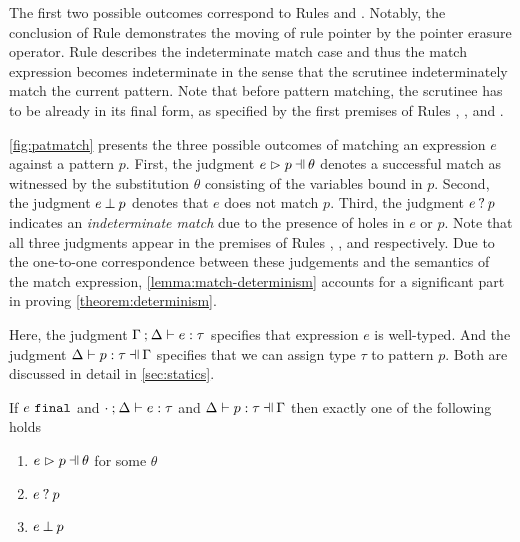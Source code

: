 The first two possible outcomes correspond to Rules \ITSuccMatch and \ITFailMatch. Notably, the conclusion of Rule \ITFailMatch demonstrates the moving of rule pointer by the pointer 
erasure operator. Rule \IMatch describes the indeterminate match case and thus the match expression becomes indeterminate in the sense that the scrutinee indeterminately match the current pattern. 
Note that before pattern matching, the scrutinee has to be already in its final form, as specified by the first premises of Rules \ITSuccMatch, \ITFailMatch, and \IMatch.




\autoref{fig:patmatch} presents the three possible outcomes of matching an expression $e$ against a pattern $p$. 
First, the judgment $\hpatmatch{e}{p}{\theta}$ denotes a successful match as witnessed by the substitution $\theta$ consisting of the variables bound in $p$. Second, the judgment $e \mathbin{\bot} p$ denotes that $e$ does not match $p$. Third, the judgment $e \mathbin{?} p$ indicates an \emph{indeterminate match} due to the presence of holes in $e$ or $p$. Note that all three judgments appear in the premises of Rules \ITSuccMatch, \ITFailMatch, and \IMatch respectively. 
Due to the one-to-one correspondence between these judgements and the semantics of the match expression, \autoref{lemma:match-determinism} accounts for a significant part in proving \autoref{theorem:determinism}.

Here, the judgment $\Gamma \mathbin{;} \Delta \vdash e : \tau$ specifies that expression $e$ is well-typed. And the judgment $\hpattyp{p}{\tau}{\Gamma}{\Delta}$ specifies that we can assign type $\tau$ to pattern $p$. Both are discussed in detail in \autoref{sec:statics}.
\begin{lemma}
  \label{lemma:match-determinism}
  If $e ~\mathtt{final}$ and $\cdot \mathbin{;} \Delta \vdash e : \tau$ and $\hpattyp{p}{\tau}{\Gamma}{\Delta}$ then exactly one of the following holds
  \begin{enumerate}
    \item $\hpatmatch{e}{p}{\theta}$ for some $\theta$
    \item $e \mathbin{?} p$
    \item $e \mathbin{\bot} p$
  \end{enumerate}
\end{lemma}

